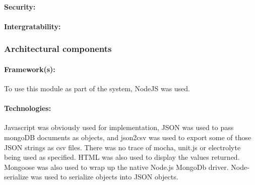 \paragraph{Security:}
\par
\paragraph{Intergratability:}
\par


\subsubsection{Architectural components}
\paragraph {Framework(s):}
 To use this module as part of the system, NodeJS was used.
\par
\paragraph{Technologies:}
 Javascript was obviously used for implementation, JSON was used to pass mongoDB documents as objects, and json2csv was used to export some of those JSON strings as csv files. There was no trace of mocha, unit.js or electrolyte being used as specified. HTML was also used to display the values returned. Mongoose was also used to wrap up the native Node.js MongoDb driver. Node-serialize was used to serialize objects into JSON objects.
\par
